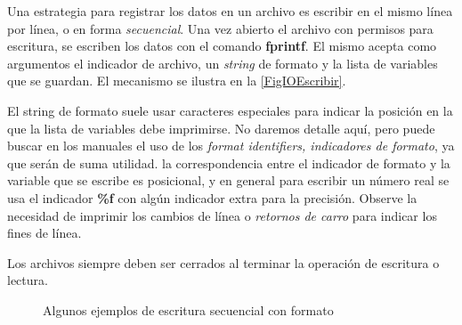 
Una estrategia para registrar los datos en un archivo es 
escribir en el mismo línea por línea, o en forma \emph{secuencial}.
Una vez abierto el archivo con permisos para escritura, 
se escriben los datos con el comando \textbf{fprintf}. 
El mismo acepta como argumentos el indicador de archivo, 
un \emph{string} de formato y la lista de variables 
que se guardan. El mecanismo se ilustra en la 
\autoref{FigIOEscribir}.

El string de formato suele usar caracteres especiales para indicar
la posición en la que la lista de variables debe 
imprimirse. No daremos detalle aquí, pero puede
buscar en los manuales el uso de los \emph{format 
identifiers, indicadores de formato}, ya que serán 
de suma utilidad. la correspondencia entre el 
indicador de formato y la variable que se escribe
es posicional, y en general para escribir un número 
real se usa el indicador \textbf{\%f} con algún 
indicador extra para la precisión. 
Observe la necesidad de imprimir los cambios de línea
o \emph{retornos de carro} para indicar los fines de línea. 

Los archivos siempre deben ser cerrados al terminar la operación 
de escritura o lectura. 

\begin{figure}
  \caption{Algunos ejemplos de escritura secuencial con formato\label{FigIOEscribir}}
\end{figure}
\mode*

